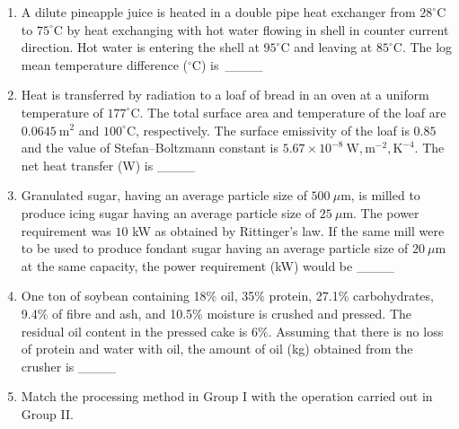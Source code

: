 \documentclass[journal,12pt,onecolumn]{IEEEtran}
\begin{document}
\begin{enumerate}[label=\arabic*)]
\newpage

\item A dilute pineapple juice is heated in a double pipe heat exchanger from $28^\circ$C to $75^\circ$C by heat exchanging with hot water flowing in shell in counter current direction. Hot water is entering the shell at $95^\circ$C and leaving at $85^\circ$C. The log mean temperature difference ($^\circ$C) is\ \_\_\_\_
\hfill{} \\

\vspace{0.5cm}

\item Heat is transferred by radiation to a loaf of bread in an oven at a uniform temperature of $177^\circ$C. The total surface area and temperature of the loaf are $0.0645\ \mathrm{m^2}$ and $100^\circ$C, respectively. The surface emissivity of the loaf is $0.85$ and the value of Stefan–Boltzmann constant is $5.67\times 10^{-8}\ \mathrm{W,m^{-2},K^{-4}}$. The net heat transfer (W) is \_\_\_\_
\hfill{} \\

\vspace{0.5cm}

\item Granulated sugar, having an average particle size of $500\ \mu$m, is milled to produce icing sugar having an average particle size of $25\ \mu$m. The power requirement was $10$ kW as obtained by Rittinger’s law. If the same mill were to be used to produce fondant sugar having an average particle size of $20\ \mu$m at the same capacity, the power requirement (kW) would be \_\_\_\_
\hfill{} \\

\vspace{0.5cm}

\item One ton of soybean containing 18\% oil, 35\% protein, 27.1\% carbohydrates, 9.4\% of fibre and ash, and 10.5\% moisture is crushed and pressed. The residual oil content in the pressed cake is 6\%. Assuming that there is no loss of protein and water with oil, the amount of oil (kg) obtained from the crusher is \_\_\_\_
\hfill{} \\

\vspace{0.5cm}

\item Match the processing method in Group I with the operation carried out in Group II.


\end{enumerate}
\end{document}
